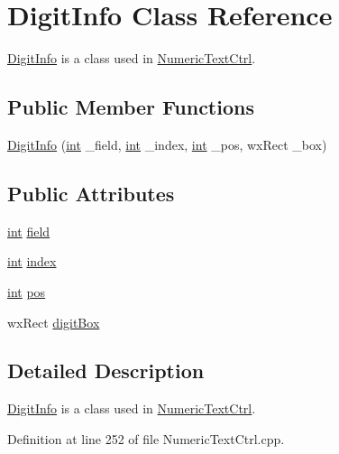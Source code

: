 \hypertarget{class_digit_info}{}\section{Digit\+Info Class Reference}
\label{class_digit_info}


\hyperlink{class_digit_info}{Digit\+Info} is a class used in \hyperlink{class_numeric_text_ctrl}{Numeric\+Text\+Ctrl}.  


\subsection*{Public Member Functions}
\begin{DoxyCompactItemize}
\item 
\hyperlink{class_digit_info_ac5ef95a3be847c37a21d2b004a29a007}{Digit\+Info} (\hyperlink{xmltok_8h_a5a0d4a5641ce434f1d23533f2b2e6653}{int} \+\_\+field, \hyperlink{xmltok_8h_a5a0d4a5641ce434f1d23533f2b2e6653}{int} \+\_\+index, \hyperlink{xmltok_8h_a5a0d4a5641ce434f1d23533f2b2e6653}{int} \+\_\+pos, wx\+Rect \+\_\+box)
\end{DoxyCompactItemize}
\subsection*{Public Attributes}
\begin{DoxyCompactItemize}
\item 
\hyperlink{xmltok_8h_a5a0d4a5641ce434f1d23533f2b2e6653}{int} \hyperlink{class_digit_info_a74189e8f3c70864df085e9d41e0c5914}{field}
\item 
\hyperlink{xmltok_8h_a5a0d4a5641ce434f1d23533f2b2e6653}{int} \hyperlink{class_digit_info_a6228de8cea52d810eac73f05a543a0d9}{index}
\item 
\hyperlink{xmltok_8h_a5a0d4a5641ce434f1d23533f2b2e6653}{int} \hyperlink{class_digit_info_aa03c72354b249402c1d8740aa5efaf96}{pos}
\item 
wx\+Rect \hyperlink{class_digit_info_a51f882e378314a322587aabcef965297}{digit\+Box}
\end{DoxyCompactItemize}


\subsection{Detailed Description}
\hyperlink{class_digit_info}{Digit\+Info} is a class used in \hyperlink{class_numeric_text_ctrl}{Numeric\+Text\+Ctrl}. 

Definition at line 252 of file Numeric\+Text\+Ctrl.\+cpp.



